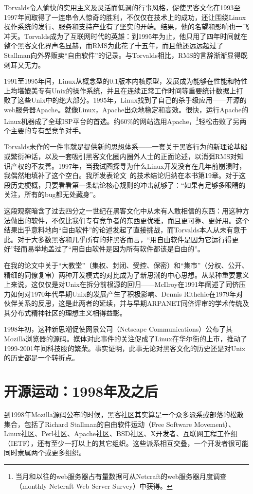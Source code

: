 \documentclass[12pt,oneside]{ctexbook}
\begin{document}
\begin{common-format}
Torvalds令人愉快的实用主义及灵活而低调的行事风格，促使黑客文化在1993至1997年间取得了一连串令人惊奇的胜利，不仅仅在技术上的成功，还让围绕Linux操作系统的发行、服务和支持产业有了坚实的开端。结果，他的名望和影响也一飞冲天。Torvalds成为了互联网时代的英雄：到1995年为止，他只用了四年时间就在整个黑客文化界声名显赫，而RMS为此花了十五年，而且他还远远超过了Stallman向外界贩卖“自由软件”的记录。与Torvalds相比，RMS的言辞渐渐显得既刺耳又无力。

1991至1995年间，Linux从概念型的0.1版本内核原型，发展成为能够在性能和特性上均堪媲美专有Unix的操作系统，并且在连续正常工作时间等重要统计数据上打败了这些Unix中的绝大部分。1995年，Linux找到了自己的杀手级应用——开源的web服务器Apache。就像Linux，Apache出众地稳定和高效。很快，运行Apache的Linux机器成了全球ISP平台的首选。约60\%{}的网站选用Apache，\footnote{当月和以往的web服务器占有量数据可从Netcraft的web服务器月度调查（monthly Netcraft Web Server Survey）中获得。}轻松击败了另两个主要的专有型竞争对手。

Torvalds未作的一件事就是提供新的思想体系——一套关于黑客行为的新理论基础或繁衍神话，以及一套吸引黑客文化圈内圈外人士的正面论述，以消弭RMS对知识产权的不友善。1997年，当我试图探寻为什么Linux开发没有在几年前崩溃时，我偶然地填补了这个空白。我所发表论文~\cite{Raymond01}的技术结论归纳在本书第19章。对于这段历史梗概，只要看看第一条结论核心规则的冲击就够了：“如果有足够多眼睛的关注，所有的bug都无处藏身”。

这段观察暗含了过去四分之一世纪在黑客文化中从未有人敢相信的东西：用这种方法做出的软件，不仅比我们专有竞争者的东西更优雅，而且更可靠、更好用。这个结果出乎意料地向“自由软件”的论述发起了直接挑战，而Torvalds本人从未有意于此。对于大多数黑客和几乎所有的非黑客而言，“用自由软件是因为它运行得更好”轻而易举地盖过了“用自由软件是因为所有软件都该是自由的”。

在我的论文中关于“大教堂”（集权、封闭、受控、保密）和“集市”（分权、公开、精细的同僚复审）两种开发模式的对比成为了新思潮的中心思想。从某种重要意义上来说，这仅仅是对Unix在拆分前根源的回归——McIlroy在1991年阐述了同侪压力如何对1970年代早期Unix的发展产生了积极影响、Dennis Rithchie在1979年对伙伴关系的反思，这是此两者的延续，并与早期ARPANET同侪评审的学术传统及其分布式精神社区的理想主义相得益彰。

1998年初，这种新思潮促使网景公司（Netscape Communications）公布了其Mozilla浏览器的源码。媒体对此事件的关注促成了Linux在华尔街的上市，推动了1999-2001年间科技股的繁荣。事实证明，此事无论对黑客文化的历史还是对Unix的历史都是一个转折点。

\section{开源运动：1998年及之后}
到1998年Mozilla源码公布的时候，黑客社区其实算是一个众多派系或部落的松散集合，包括了Richard Stallman的自由软件运动（Free Software Movement）、Linux社区、Perl社区、Apache社区、BSD社区、X开发者、互联网工程工作组（IETF），还有至少一打以上的其它组织。这些派系相互交叠，一个开发者很可能同时隶属两个或更多组织。


\end{common-format}
\end{document}
